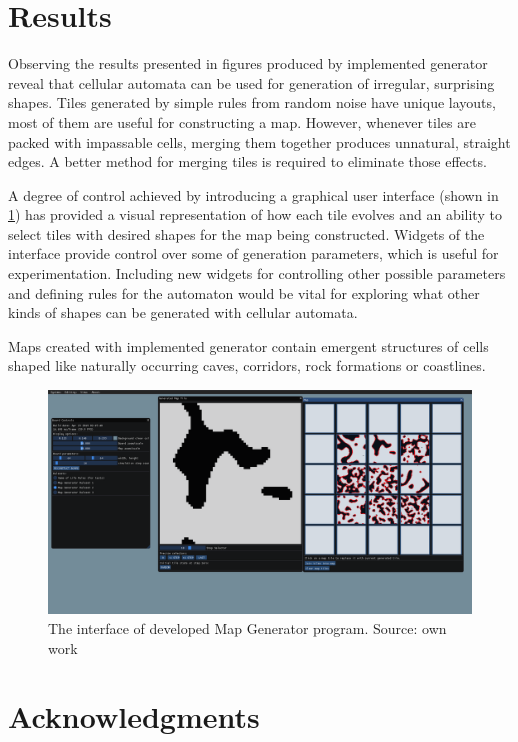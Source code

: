 \documentclass[12pt]{report}
\begin{document}
\section{Results}

Observing the results presented in figures produced by implemented generator reveal that cellular automata can be used for generation of irregular, surprising shapes. Tiles generated by simple rules from random noise have unique layouts, most of them are useful for constructing a map. However, whenever tiles are packed with impassable cells, merging them together produces unnatural, straight edges. A better method for merging tiles is required to eliminate those effects.

A degree of control achieved by introducing a graphical user interface (shown in \cref{fig:interfacemapgen}) has provided a visual representation of how each tile evolves and an ability to select tiles with desired shapes for the map being constructed. Widgets of the interface provide control over some of generation parameters, which is useful for experimentation. Including new widgets for controlling other possible parameters and defining rules for the automaton would be vital for exploring what other kinds of shapes can be generated with cellular automata. 

Maps created with implemented generator contain emergent structures of cells shaped like naturally occurring caves, corridors, rock formations or coastlines.
 
\begin{figure}[h]
	\centering
	\includegraphics[width=\linewidth]{images/interface_mapgen}
	\caption{The interface of developed Map Generator program. Source: own work}
	\label{fig:interfacemapgen}
\end{figure} 

\section{Acknowledgments}
\end{document}
